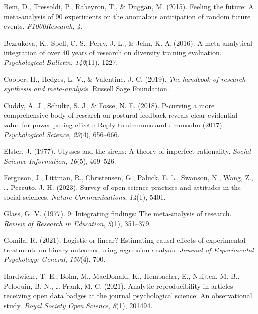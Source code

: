 \documentclass[
  man]{apa6}
\newlength{\cslhangindent}
\newenvironment{CSLReferences}[2] %
 {\begin{list}{}{%
  \setlength{\itemindent}{0pt}
  \setlength{\leftmargin}{0pt}
  \setlength{\parsep}{0pt}
  \ifodd #1
   \setlength{\leftmargin}{\cslhangindent}
   \setlength{\itemindent}{-1\cslhangindent}
  \fi
  \setlength{\itemsep}{#2\baselineskip}}}
 {\end{list}}
\begin{document}
\label{refs}
\begin{CSLReferences}{1}{0}
Bem, D., Tressoldi, P., Rabeyron, T., \& Duggan, M. (2015). Feeling the future: A meta-analysis of 90 experiments on the anomalous anticipation of random future events. \emph{F1000Research}, \emph{4}.

Bezrukova, K., Spell, C. S., Perry, J. L., \& Jehn, K. A. (2016). A meta-analytical integration of over 40 years of research on diversity training evaluation. \emph{Psychological Bulletin}, \emph{142}(11), 1227.

Cooper, H., Hedges, L. V., \& Valentine, J. C. (2019). \emph{The handbook of research synthesis and meta-analysis}. Russell Sage Foundation.

Cuddy, A. J., Schultz, S. J., \& Fosse, N. E. (2018). P-curving a more comprehensive body of research on postural feedback reveals clear evidential value for power-posing effects: Reply to simmons and simonsohn (2017). \emph{Psychological Science}, \emph{29}(4), 656--666.

Elster, J. (1977). Ulysses and the sirens: A theory of imperfect rationality. \emph{Social Science Information}, \emph{16}(5), 469--526.

Ferguson, J., Littman, R., Christensen, G., Paluck, E. L., Swanson, N., Wang, Z., \ldots{} Pezzuto, J.-H. (2023). Survey of open science practices and attitudes in the social sciences. \emph{Nature Communications}, \emph{14}(1), 5401.

Glass, G. V. (1977). 9: Integrating findings: The meta-analysis of research. \emph{Review of Research in Education}, \emph{5}(1), 351--379.

Gomila, R. (2021). Logistic or linear? Estimating causal effects of experimental treatments on binary outcomes using regression analysis. \emph{Journal of Experimental Psychology: General}, \emph{150}(4), 700.

Hardwicke, T. E., Bohn, M., MacDonald, K., Hembacher, E., Nuijten, M. B., Peloquin, B. N., \ldots{} Frank, M. C. (2021). Analytic reproducibility in articles receiving open data badges at the journal psychological science: An observational study. \emph{Royal Society Open Science}, \emph{8}(1), 201494.


\end{CSLReferences}
\end{document}

